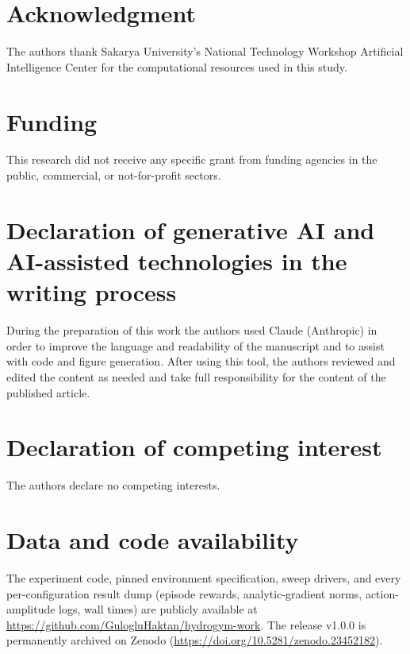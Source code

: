 \documentclass[a4paper,fleqn]{cas-dc}
\begin{document}
\maketitle










\section*{Acknowledgment}
The authors thank Sakarya University's National Technology Workshop
Artificial Intelligence Center for the computational resources used in this
study.

\section*{Funding}
This research did not receive any specific grant from funding agencies in the
public, commercial, or not-for-profit sectors.

\section*{Declaration of generative AI and AI-assisted technologies in the writing process}
During the preparation of this work the authors used Claude (Anthropic) in order
to improve the language and readability of the manuscript and to assist with
code and figure generation. After using this tool, the authors reviewed and
edited the content as needed and take full responsibility for the content of
the published article.

\section*{Declaration of competing interest}
The authors declare no competing interests.

\section*{Data and code availability}
The experiment code, pinned environment specification, sweep drivers, and
every per-configuration result dump (episode rewards, analytic-gradient
norms, action-amplitude logs, wall times) are publicly available at
\url{https://github.com/GulogluHaktan/hydrogym-work}. The release v1.0.0 is permanently
archived on Zenodo (\url{https://doi.org/10.5281/zenodo.23452182}).
\end{document}
